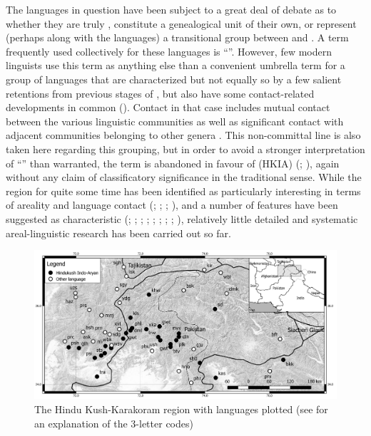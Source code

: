 \documentclass[output=collectionpaper]{langsci/langscibook}
\begin{document}
The languages in question have been subject to a great deal of debate as to whether they are truly , constitute a genealogical unit of their own, or represent (perhaps along with the  languages) a transitional group between  and . A term frequently used collectively for these languages is ``''. However, few modern linguists use this term as anything else than a convenient umbrella term for a group of languages that are characterized \textendash{} but not equally so \textendash{} by a few salient retentions from previous stages of  \citep[3]{Morgenstierne1974}, but also have some contact-related developments in common (\citealt[821--822]{Bashir2003}). Contact in that case includes mutual contact between the various  linguistic communities as well as significant contact with adjacent communities belonging to other genera \citep{Liljegren2017}. This non-committal line is also taken here regarding this grouping, but in order to avoid a stronger interpretation of ``'' than warranted, the term is  abandoned in favour of  (HKIA) (\citealt[135]{Liljegren2014}; \citealt[23]{HeegardPetersen2015}), again without any claim of classificatory significance in the traditional sense. While the region for quite some time has been identified as particularly interesting in terms of areality and language contact (\citealt{Emeneau1965}; \citealt{Skalmowski1985}; \citealt[43]{Masica1991}; \citealt[259]{Masica2001}), and a number of features have been suggested as characteristic (\citealt[392--420]{Bashir1988}; \citealt{Bashir1996}; \citealt[821--823]{Bashir2003}; \citealt{Edelman1980}; \citealt[35--59]{Edelman1983}; \citealt[389--399]{Fussman1972}; \citealt{Tikkanen1999,Tikkanen2008}; \citealt{Baart2014}; \citealt{Toporov1970}), relatively little detailed and systematic areal-linguistic research has been carried out so far.

\begin{figure}
\includegraphics[width=\textwidth]{figures/10/map1}
\caption{The Hindu Kush-Karakoram region with languages plotted (see  for an explanation of the 3-letter codes)}
\label{fig:Lilje:1}
\end{figure}
\end{document}
